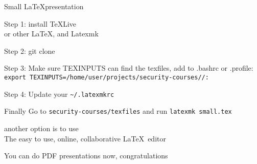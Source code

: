 \documentclass[Screen16to9,17pt]{foils}
\begin{document}
{}

\mytitlepage
{Small \LaTeX presentation}

\LogoOn


\begin{list1}
\item Step 1: install \TeX Live \\
 or other \LaTeX, and Latexmk 
\item Step 2: git clone 
\item Step 3: Make sure TEXINPUTS can find the texfiles, add to .bashrc or .profile:\\
\verb+export TEXINPUTS=/home/user/projects/security-courses//:+
\item Step 4: Update your \verb+~/.latexmkrc+
\vskip 5mm
\item Finally Go to \verb+security-courses/texfiles+ and run \verb+latexmk small.tex+
\item another option is to use \\ The easy to use, online, collaborative \LaTeX\ editor
\end{list1}

\vskip 5mm
\centerline{\LARGE You can do PDF presentations now, congratulations}
\end{document}
